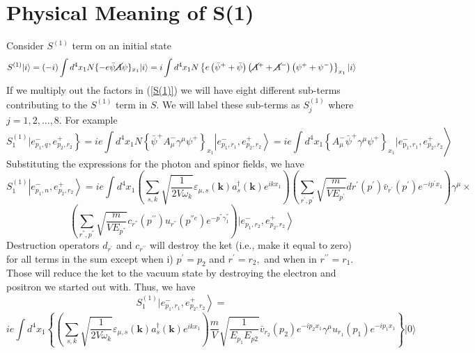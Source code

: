 \section{Physical Meaning of S(1)}
Consider $S^{(1)}$ term on an initial state
\begin{equation}
S^{(1)}|i\rangle=(-i) \int d^{4} x_{1} N\{-e \bar{\psi} \cancel{A} \psi\}_{x_{1}}|i\rangle= i \int d^{4} x_{1} N\left\{e\left(\bar{\psi}^{+}+\bar{\psi}\right)\left(\cancel{A}^{+}+\cancel{A}^{-}\right)\left(\psi^{+}+\psi^{-}\right)\right\}_{x_{1}}|i\rangle
\label{S(1)}
\end{equation}
If we multiply out the factors in (\ref{S(1)}) we will have eight different sub-terms contributing to the
$S^{(1)}$ term in $S .$ We will label these sub-terms as $S_{j}^{(1)}$ where $j=1,2, \ldots, 8$. For example
$$
\left.S_{1}^{(1)} | e_{p_{1}, q}^{-}, e_{p_{2}, r_{2}}^{+}\right\}=i e \int d^{4} x_{1} N\left\{\bar{\psi}^{+} A^-_{\mu} \gamma^{\mu} \psi^{+}\right\}_{x_{1}}\left|e_{p_{1}, r_{1}}^{-}, e_{p_{2}, r_{2}}^{+}\right\rangle\left.=i e \int d^{4} x_{1}\left\{A_{\mu}^{-} \bar{\psi}^{+} \gamma^{\mu} \psi^{+}\right\}_{x_{1}} | e_{\mathrm{p}_{1}, r_{1}}^{-}, e_{p_{2}, r_{2}}^{+}\right\rangle
$$
Substituting the expressions for the photon and spinor fields, we have
$$
S_{1}^{(1)}\left|e_{p_{1}, n}^{-}, e_{p_{2}, r_{2}}^{+}\right\rangle= i e \int d^{4} x_{1}\left(\sum_{s, k} \sqrt{\frac{1}{2 V{\omega_{k}}}} \varepsilon_{\mu, s}(\mathbf{k}) a_{s}^{\dagger}(\mathbf{k}) e^{i kx_1}\right)\left(\sum_{r^{\prime}, p^{\prime}} \sqrt{\frac{m}{V E_{p^{\prime}}}} d r^{\prime}\left(p^{\prime}\right) \bar{v}_{r^{\prime}}\left(p^{\prime}\right) e^{-i p^{\prime} x_{1}}\right) \gamma^{\mu}\times
$$
$$
\left(\sum_{r^{''}, p^{''}} \sqrt{\frac{m}{V E_{p^{''}}}} c_{r^{''}}\left(p^{\prime \prime}\right) u_{r^{''}}\left(p^{''e}\right) e^{-p^{''} \gamma_{1}^{''}}\right)\left.| e_{p_{1}, r_{2}}^{-}, e^{+}_{ p_{2}, r_{2}}\right\rangle
$$
Destruction operators $d_{r^{\prime}}$ and $c_{r^{\prime \prime}}$ will destroy the ket (i.e., make it equal to zero) for all terms in the sum except when i) $p^{\prime}=p_{2}$ and $r^{\prime}=r_{2},$ and when in $r^{\prime \prime}=r_{1}$. Those will reduce the ket to the vacuum state by destroying the electron and positron we started out with. Thus, we have 
$$
\left.S_{1}^{(1)} | e_{p_{1}, r_{1}}^{-}, e_{p_{2}, r_{2}}^{+}\right\rangle=
$$
$$
ie  \int d^{4} x_{1}\left\{\left(\sum_{s, k} \sqrt{\frac{1}{2 V{\omega_{k}}}} \varepsilon_{\mu, s}(\mathbf{k}) a_{s}^{\dagger}(\mathbf{k}) e^{i kx_1}\right)\right.\left.\frac{m}{V} \sqrt{\frac{1}{E_{p_{1}} E_{p 2}}} \bar{v}_{r_{2}}\left(p_{2}\right) e^{-i p_{2} x_{1}} \gamma^{\mu} u_{r_1}\left(p_{1}\right) e^{-i p_{1} x_{1}}\right\}|0\rangle
$$
